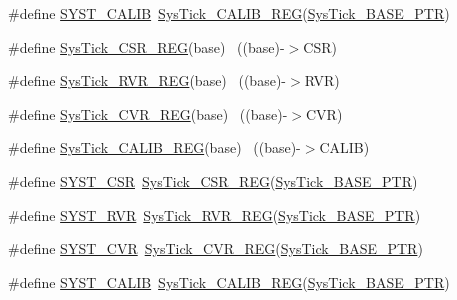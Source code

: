 \begin{DoxyCompactItemize}
\item 
\#define \hyperlink{group___sys_tick___register___accessor___macros_ga2d37582dd39f59744e340cce09230250}{S\+Y\+S\+T\+\_\+\+C\+A\+L\+IB}~\hyperlink{group___sys_tick___register___accessor___macros_gab41be68de8d2d31d938d419f9feb900f}{Sys\+Tick\+\_\+\+C\+A\+L\+I\+B\+\_\+\+R\+EG}(\hyperlink{group___sys_tick___peripheral_gaeef73642fdef722ce658e468dad877ea}{Sys\+Tick\+\_\+\+B\+A\+S\+E\+\_\+\+P\+TR})
\item 
\#define \hyperlink{group___sys_tick___register___accessor___macros_ga07f2beb63f7b50b9e1fa8b383d9ca87c}{Sys\+Tick\+\_\+\+C\+S\+R\+\_\+\+R\+EG}(base)                                    ~((base)-\/$>$C\+SR)
\item 
\#define \hyperlink{group___sys_tick___register___accessor___macros_gae6985161bde8ca82ac983a2d43839595}{Sys\+Tick\+\_\+\+R\+V\+R\+\_\+\+R\+EG}(base)                                    ~((base)-\/$>$R\+VR)
\item 
\#define \hyperlink{group___sys_tick___register___accessor___macros_ga12164c6b1ad1c5e5d5cac7129940d0bf}{Sys\+Tick\+\_\+\+C\+V\+R\+\_\+\+R\+EG}(base)                                    ~((base)-\/$>$C\+VR)
\item 
\#define \hyperlink{group___sys_tick___register___accessor___macros_gab41be68de8d2d31d938d419f9feb900f}{Sys\+Tick\+\_\+\+C\+A\+L\+I\+B\+\_\+\+R\+EG}(base)                                ~((base)-\/$>$C\+A\+L\+IB)
\item 
\#define \hyperlink{group___sys_tick___register___accessor___macros_gab26b3fc75982181f81b185b206e897f6}{S\+Y\+S\+T\+\_\+\+C\+SR}~\hyperlink{group___sys_tick___register___accessor___macros_ga07f2beb63f7b50b9e1fa8b383d9ca87c}{Sys\+Tick\+\_\+\+C\+S\+R\+\_\+\+R\+EG}(\hyperlink{group___sys_tick___peripheral_gaeef73642fdef722ce658e468dad877ea}{Sys\+Tick\+\_\+\+B\+A\+S\+E\+\_\+\+P\+TR})
\item 
\#define \hyperlink{group___sys_tick___register___accessor___macros_ga4e8efcc1f2b551dbf3cb0aae1231e380}{S\+Y\+S\+T\+\_\+\+R\+VR}~\hyperlink{group___sys_tick___register___accessor___macros_gae6985161bde8ca82ac983a2d43839595}{Sys\+Tick\+\_\+\+R\+V\+R\+\_\+\+R\+EG}(\hyperlink{group___sys_tick___peripheral_gaeef73642fdef722ce658e468dad877ea}{Sys\+Tick\+\_\+\+B\+A\+S\+E\+\_\+\+P\+TR})
\item 
\#define \hyperlink{group___sys_tick___register___accessor___macros_gae3dc4d2dbfdf38c593a5581415fecfed}{S\+Y\+S\+T\+\_\+\+C\+VR}~\hyperlink{group___sys_tick___register___accessor___macros_ga12164c6b1ad1c5e5d5cac7129940d0bf}{Sys\+Tick\+\_\+\+C\+V\+R\+\_\+\+R\+EG}(\hyperlink{group___sys_tick___peripheral_gaeef73642fdef722ce658e468dad877ea}{Sys\+Tick\+\_\+\+B\+A\+S\+E\+\_\+\+P\+TR})
\item 
\#define \hyperlink{group___sys_tick___register___accessor___macros_ga2d37582dd39f59744e340cce09230250}{S\+Y\+S\+T\+\_\+\+C\+A\+L\+IB}~\hyperlink{group___sys_tick___register___accessor___macros_gab41be68de8d2d31d938d419f9feb900f}{Sys\+Tick\+\_\+\+C\+A\+L\+I\+B\+\_\+\+R\+EG}(\hyperlink{group___sys_tick___peripheral_gaeef73642fdef722ce658e468dad877ea}{Sys\+Tick\+\_\+\+B\+A\+S\+E\+\_\+\+P\+TR})
\end{DoxyCompactItemize}


